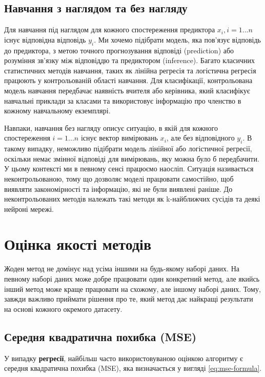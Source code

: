 \documentclass[14pt,a4paper]{extarticle}
\newcounter{e}
\numberwithin{equation}{section}
\numberwithin{figure}{section}
\begin{document}
	\subsection{Навчання з наглядом та без нагляду}
    
    Для навчання під наглядом для кожного спостереження предиктора $x_{i}, i = 1...n$ існує відповідна відповідь $y_{i}$. Ми хочемо підібрати модель, яка пов’язує відповідь до предиктора, з метою точного прогнозування відповіді (prediction) або розуміння зв'язку між відповіддю та предиктором (inference). Багато класичних статистичних методів навчання, таких як лінійна регресія та логістична регресія працюють у контрольованій області навчання. Для класифікації, контрольована модель навчання передбачає наявність вчителя або керівника, який класифікує навчальні приклади за класами та використовує інформацію про членство в кожному навчальному екземплярі. \newline
    
    Навпаки, навчання без нагляду описує ситуацію, в якій для кожного спостереження $i = 1...n$ існує вектор вимірювань $x_{i}$, але без відповідного $y_{i}$. В такому випадку, неможливо підібрати модель лінійної або логістичної регресії, оскільки немає змінної відповіді для вимірювань, яку можна було б передбачити. У цьому контексті ми в певному сенсі працюємо наосліп. Ситуація називається неконтрольованою, тому що дозволяє моделі працювати самостійно, щоб виявляти закономірності та інформацію, які не були виявлені раніше. До неконтрольованих методів належать такі методи як k-найближчих сусідів та деякі нейроні мережі.
    
    \newpage
    \thispagestyle{empty}
    \section{Оцінка якості методів}
    
    Жоден метод не домінує над усіма іншими на будь-якому наборі даних. На певному наборі даних може добре працювати один конкретний метод, але якийсь інший метод може краще працювати на схожому, але іншому наборі даних. Тому, завжди важливо приймати рішення про те, який метод дає найкращі результати на основі кожного окремого датасету.

    \subsection{Середня квадратична похибка (MSE)}

	У випадку \textbf{регресії}, найбільш часто використовуваною оцінкою алгоритму є середня квадратична похибка (MSE), яка визначається у вигляді \ref{eq:mse-formula}.
\end{document}
